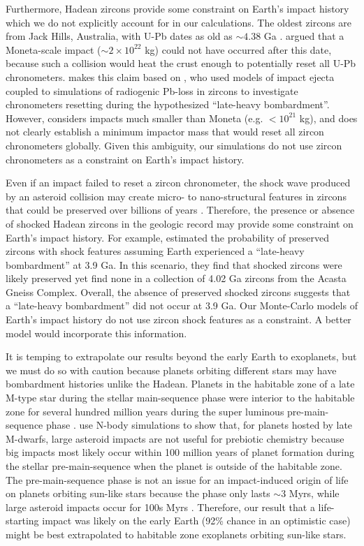 \documentclass[manuscript]{aastex63}
\begin{document}
Furthermore, Hadean zircons provide some constraint on Earth's impact history which we do not explicitly account for in our calculations. The oldest zircons are from Jack Hills, Australia, with U-Pb dates as old as $\sim 4.38$ Ga \citep{Valley_2014}. \citet{Benner_2020} argued that a Moneta-scale impact ($\sim 2 \times 10^{22}$ kg) could not have occurred after this date, because such a collision would heat the crust enough to potentially reset all U-Pb chronometers. \citet{Benner_2020} makes this claim based on \citet{Abramov_2013}, who used models of impact ejecta coupled to simulations of radiogenic Pb-loss in zircons to investigate chronometers resetting during the hypothesized ``late-heavy bombardment''. However, \citet{Abramov_2013} considers impacts much smaller than Moneta (e.g. $< 10^{21}$ kg), and does not clearly establish a minimum impactor mass that would reset all zircon chronometers globally. Given this ambiguity, our simulations do not use zircon chronometers as a constraint on Earth's impact history.

Even if an impact failed to reset a zircon chronometer, the shock wave produced by an asteroid collision may create micro- to nano-structural features in zircons that could be preserved over billions of years \citep{Reimink_2023}. Therefore, the presence or absence of shocked Hadean zircons in the geologic record may provide some constraint on Earth's impact history. For example, \citet{Reimink_2023} estimated the probability of preserved zircons with shock features assuming Earth experienced a ``late-heavy bombardment'' at 3.9 Ga. In this scenario, they find that shocked zircons were likely preserved yet find none in a collection of 4.02 Ga zircons from the Acasta Gneiss Complex. Overall, the absence of preserved shocked zircons suggests that a ``late-heavy bombardment'' did not occur at 3.9 Ga. Our Monte-Carlo models of Earth's impact history do not use zircon shock features as a constraint. A better model would incorporate this information.

It is temping to extrapolate our results beyond the early Earth to exoplanets, but we must do so with caution because planets orbiting different stars may have bombardment histories unlike the Hadean. Planets in the habitable zone of a late M-type star during the stellar main-sequence phase were interior to the habitable zone for several hundred million years during the super luminous pre-main-sequence phase \citep{Luger_2015}. \citet{Lichtenberg_2022} use N-body simulations to show that, for planets hosted by late M-dwarfs, large asteroid impacts are not useful for prebiotic chemistry because big impacts most likely occur within 100 million years of planet formation during the stellar pre-main-sequence when the planet is outside of the habitable zone. The pre-main-sequence phase is not an issue for an impact-induced origin of life on planets orbiting sun-like stars because the phase only lasts $\sim 3$ Myrs, while large asteroid impacts occur for 100s Myrs \citep{Lichtenberg_2022}. Therefore, our result that a life-starting impact was likely on the early Earth (92\% chance in an optimistic case) might be best extrapolated to habitable zone exoplanets orbiting sun-like stars.
\end{document}
